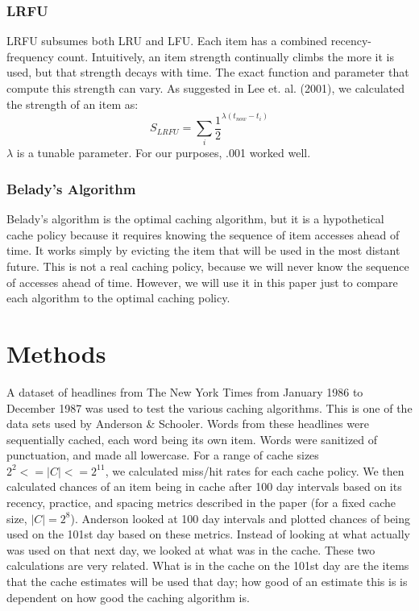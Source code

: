 \documentclass[10pt,letterpaper]{article}
\begin{document}
\subsubsection{LRFU}

LRFU subsumes both LRU and LFU. Each item has a combined recency-frequency count.
Intuitively, an item strength continually climbs the more it is used, but that
strength decays with time. The exact function and parameter that compute this strength can
vary. As suggested in Lee et. al. (2001), we calculated the strength of an item as:
$$
S_{LRFU} = \sum_i \frac{1}{2}^{\lambda(t_{now} - t_i)}
$$
$\lambda$ is a tunable parameter. For our purposes, .001 worked well. 


\subsubsection{Belady's Algorithm}

Belady's algorithm is the optimal caching algorithm, but it is a hypothetical
cache policy because it requires knowing the sequence of item accesses ahead of time.
It works simply by evicting the item that will be used in the most distant future. This is not
a real caching policy, because we will never know the sequence of accesses ahead of time. However,
we will use it in this paper just to compare each algorithm to the optimal caching policy.


\section{Methods}

A dataset of headlines from The New York Times from January 1986 to December
1987 was used to test the various caching algorithms. This is one of the data
sets used by Anderson \& Schooler. Words from these
headlines were sequentially cached, each word being its own item. Words were
sanitized of punctuation, and made all lowercase. For a range of cache sizes $2^2 <= |C| <= 2^{11}$, we
calculated miss/hit rates for each cache policy. We then 
calculated chances of an item being in cache after 100 day intervals based on its recency, practice,
and spacing metrics described in the paper (for a fixed cache size, $|C| = 2^8$). Anderson looked at 100 day intervals
and plotted chances of being used on the 101st day based on these metrics.
Instead of looking at what actually was used on that next day, we looked at what was in the
cache. These two calculations are very related. What is in the
cache on the 101st day are the items that the cache estimates will be used that day;
how good of an estimate this is is dependent on how good the caching algorithm is.
\end{document}
